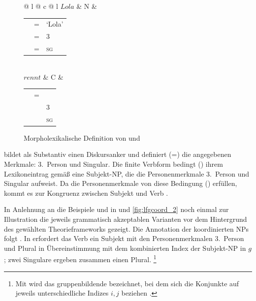 \begin{figure}
\begin{tabular}[t]{@{} l @{\hspace{2em}} c @{\hspace{2em}} l}
	$Lola$
	&	N
	&	\begin{tabular}[t]{l l l}
			\ups{pred}	& =	& `Lola' \\
			\ups{pers}	& =	& 3 \\
			\ups{num}	& =	& \textsc{sg} \\
		\end{tabular}
	\medskip \\

	$rennt$
	&	C
	&	\begin{tabular}[t]{l l l}
			\ups{pred}		& = 	& \astruct{rennen}{\ups{subj}} \\
			\ups{subj pers}	& \req	& 3 \\
			\ups{subj num}	& \req	& \textsc{sg} \\
		\end{tabular}
\end{tabular}
\caption{Morpholexikalische Definition von  und }
\label{fig:lolamorphlex}
\end{figure}

 bildet als Substantiv einen Diskursanker und definiert (=) die
angegebenen Merk\-male: 3.~Person und Singular. Die finite Verbform 
bedingt (\req) ihrem Lexikoneintrag gemäß eine Subjekt-NP, die die
Personenmerkmale 3.~Person und Singular aufweist. Da die Personenmerkmale von
 diese Bedingung () erfüllen, kommt es zur Kongruenz
zwischen Subjekt und Verb
\autocite[vgl.][59]{bresnanetal2016}.

In Anlehnung an die Beispiele  und  in
 und \ref{fig:lfgcoord_2} noch einmal zur Illustration
die jeweils grammatisch akzeptablen Varianten vor dem Hintergrund des gewählten
Theorieframeworks gezeigt. Die Annotation der koordinierten NPs folgt
\citet{peterson2004}. In  erfordert das Verb
 ein Subjekt mit den Personenmerkmalen 3.~Person und Plural in
Übereinstimmung mit dem kombinierten Index der Subjekt-NP in $g$; zwei
Singulare ergeben zusammen einen Plural.%
%
	\footnote{Mit  wird das gruppenbildende  bezeichnet, bei
		dem sich die Konjunkte auf jeweils unterschiedliche Indizes $i, j$
		beziehen \autocite[382--383]{dalrymple2001}.}

